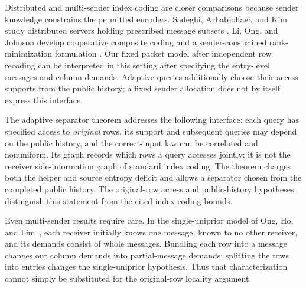 Distributed and multi-sender index coding are closer comparisons because
sender knowledge constrains the permitted encoders. Sadeghi, Arbabjolfaei,
and Kim study distributed servers holding prescribed message subsets
\cite{SadeghiArbabjolfaeiKim2016}. Li, Ong, and Johnson develop cooperative
composite coding and a sender-constrained rank-minimization formulation
\cite{LiOngJohnson2019,LiOngJohnsonRank2019}. Our fixed packet model after
independent row recoding can be interpreted in this setting after specifying
the entry-level messages and column demands. Adaptive queries additionally choose their
access supports from the public history; a fixed sender allocation does not
by itself express this interface.

The adaptive separator theorem addresses the following interface: each query
has specified access to \emph{original} rows, its support and subsequent
queries may depend on the public history, and the correct-input law can be
correlated and nonuniform. Its graph records which rows a query accesses
jointly; it is not the receiver side-information graph of standard index
coding. The theorem charges both the helper and source entropy deficit and
allows a separator chosen from the completed public history. The original-row access and public-history hypotheses distinguish this
statement from the cited index-coding bounds.

Even multi-sender results require care. In the single-uniprior model of
Ong, Ho, and Lim~\cite{OngHoLim2016}, each receiver initially knows one
message, known to no other receiver, and its demands consist of whole
messages. Bundling each row into a message changes our column demands into
partial-message demands; splitting the rows into entries changes the
single-uniprior hypothesis. Thus that characterization cannot simply be
substituted for the original-row locality argument.

